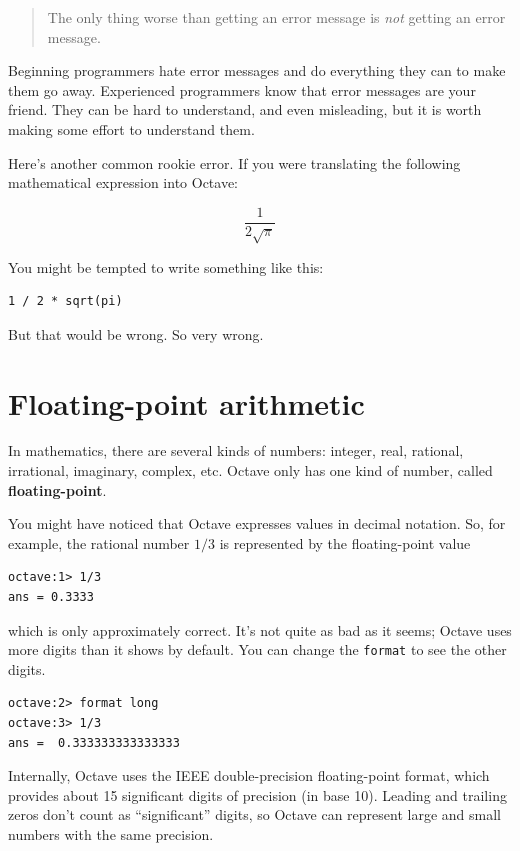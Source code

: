 \documentclass{book}
\begin{document}
\begin{quote}
The only thing worse than getting an error message is {\em not}
getting an error message.
\end{quote}

Beginning programmers hate error messages and do everything they
can to make them go away. Experienced programmers know that error
messages are your friend. They can be hard to understand, and even
misleading, but it is worth making some effort to understand them.

Here's another common rookie error. If you were translating
the following mathematical
expression into Octave:

\[ \frac{1}{2 \sqrt \pi}\]

You might be tempted to write something like this:

\begin{verbatim}
1 / 2 * sqrt(pi)
\end{verbatim}

But that would be wrong. So very wrong.


\section{Floating-point arithmetic}

In mathematics, there are several kinds of numbers: integer, real,
rational, irrational, imaginary, complex, etc. Octave only has one
kind of number, called {\bf floating-point}.

You might have noticed that Octave expresses values in decimal
notation. So, for example, the rational number $1/3$ is represented
by the floating-point value

\begin{verbatim}
octave:1> 1/3
ans = 0.3333
\end{verbatim}

which is only approximately correct. It's not quite as bad as
it seems; Octave uses more digits than it shows by default.
You can change the {\tt format} to see the other digits.

\begin{verbatim}
octave:2> format long
octave:3> 1/3
ans =  0.333333333333333
\end{verbatim}

Internally, Octave uses the IEEE double-precision floating-point
format, which provides about 15 significant digits of precision (in
base 10). Leading and trailing zeros don't count as ``significant''
digits, so Octave can represent large and small numbers
with the same precision.
\end{document}
